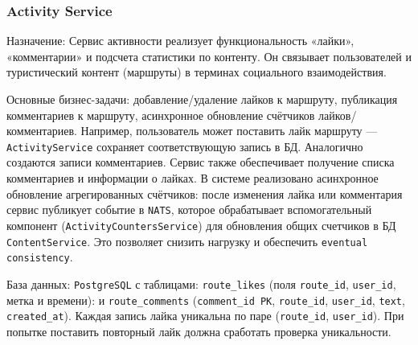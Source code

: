 \subsubsection*{Activity Service}
Назначение: Сервис активности реализует функциональность «лайки», «комментарии» и подсчета статистики по контенту. Он связывает пользователей и туристический контент (маршруты) в терминах социального взаимодействия.

Основные бизнес-задачи: добавление/удаление лайков к маршруту, публикация комментариев к маршруту, асинхронное обновление счётчиков лайков/комментариев. Например, пользователь может поставить лайк маршруту — \texttt{ActivityService} сохраняет соответствующую запись в БД. Аналогично создаются записи комментариев. Сервис также обеспечивает получение списка комментариев и информации о лайках. В системе реализовано асинхронное обновление агрегированных счётчиков: после изменения лайка или комментария сервис публикует событие в \texttt{NATS}, которое обрабатывает вспомогательный компонент (\texttt{ActivityCountersService}) для обновления общих счетчиков в БД \texttt{ContentService}. Это позволяет снизить нагрузку и обеспечить \texttt{eventual consistency}.

База данных: \texttt{PostgreSQL} с таблицами: \texttt{route\_likes} (поля \texttt{route\_id}, \texttt{user\_id}, метка и времени): и \texttt{route\_comments} (\texttt{comment\_id PK}, \texttt{route\_id}, \texttt{user\_id}, \texttt{text}, \texttt{created\_at}). Каждая запись лайка уникальна по паре (\texttt{route\_id}, \texttt{user\_id}). При попытке поставить повторный лайк должна сработать проверка уникальности. 

